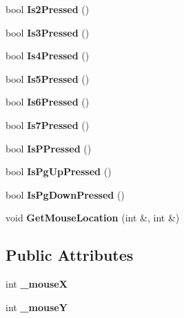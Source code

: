 \begin{DoxyCompactItemize}
\item 
\hypertarget{class_input_ac8619f3ea58da10c08135c7f561e990d}{bool {\bfseries Is2\-Pressed} ()}\label{class_input_ac8619f3ea58da10c08135c7f561e990d}

\item 
\hypertarget{class_input_ad8df169d124b9c975cf2c7d2317e0e22}{bool {\bfseries Is3\-Pressed} ()}\label{class_input_ad8df169d124b9c975cf2c7d2317e0e22}

\item 
\hypertarget{class_input_a86c2523f52a53b4402e1c37c059a9d64}{bool {\bfseries Is4\-Pressed} ()}\label{class_input_a86c2523f52a53b4402e1c37c059a9d64}

\item 
\hypertarget{class_input_a23b35b081b6fafa838fec3ffed422b28}{bool {\bfseries Is5\-Pressed} ()}\label{class_input_a23b35b081b6fafa838fec3ffed422b28}

\item 
\hypertarget{class_input_affe48f6e8f39968e5f4c95130a912d24}{bool {\bfseries Is6\-Pressed} ()}\label{class_input_affe48f6e8f39968e5f4c95130a912d24}

\item 
\hypertarget{class_input_abf0b03e1d89b4c8af599cc35764ccf7f}{bool {\bfseries Is7\-Pressed} ()}\label{class_input_abf0b03e1d89b4c8af599cc35764ccf7f}

\item 
\hypertarget{class_input_a2bef2ce131c1a61f3e80c84cf8f64f9b}{bool {\bfseries Is\-P\-Pressed} ()}\label{class_input_a2bef2ce131c1a61f3e80c84cf8f64f9b}

\item 
\hypertarget{class_input_af6123f7aedd0094e727e9371d2bbccb7}{bool {\bfseries Is\-Pg\-Up\-Pressed} ()}\label{class_input_af6123f7aedd0094e727e9371d2bbccb7}

\item 
\hypertarget{class_input_abe827d419f1d14457531d490050b617e}{bool {\bfseries Is\-Pg\-Down\-Pressed} ()}\label{class_input_abe827d419f1d14457531d490050b617e}

\item 
\hypertarget{class_input_a5b57c222f3cea82685bef56cb9a52aa9}{void {\bfseries Get\-Mouse\-Location} (int \&, int \&)}\label{class_input_a5b57c222f3cea82685bef56cb9a52aa9}

\end{DoxyCompactItemize}
\subsection*{Public Attributes}
\begin{DoxyCompactItemize}
\item 
\hypertarget{class_input_aca0c1077df54b748290c4e2cffd847d5}{int {\bfseries \-\_\-mouse\-X}}\label{class_input_aca0c1077df54b748290c4e2cffd847d5}

\item 
\hypertarget{class_input_ac0dff225b14df1b94b90ef8f76ec232f}{int {\bfseries \-\_\-mouse\-Y}}\label{class_input_ac0dff225b14df1b94b90ef8f76ec232f}

\end{DoxyCompactItemize}


